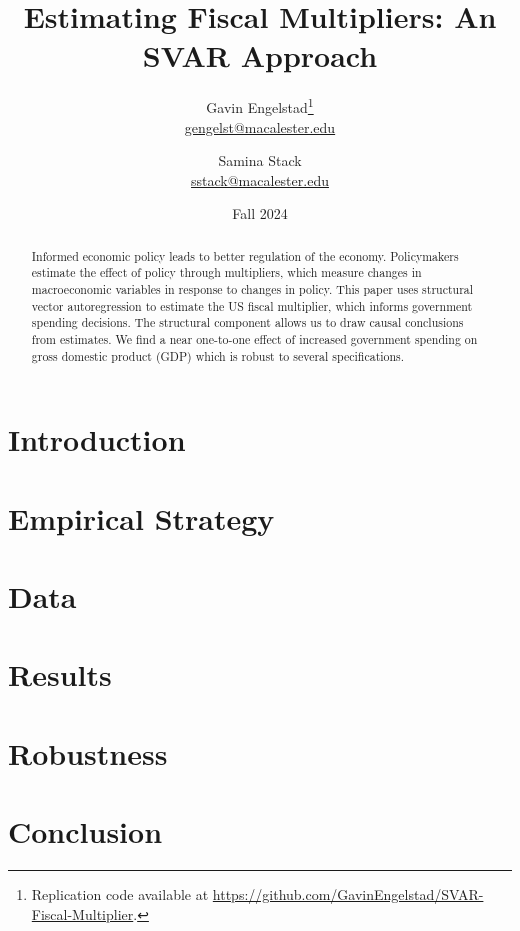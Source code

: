 \documentclass[11pt]{article}
\title{Estimating Fiscal Multipliers: An SVAR Approach}
\author{Gavin Engelstad\thanks{Replication code available at \url{https://github.com/GavinEngelstad/SVAR-Fiscal-Multiplier}.} \\ \href{mailto:gengelst@macalester.edu}{gengelst@macalester.edu} \and Samina Stack \\ \href{mailto:sstack@macalester.edu}{sstack@macalester.edu}}
\date{Fall 2024}
\numberwithin{equation}{section} %
\numberwithin{figure}{section} %
\numberwithin{table}{section} %
\begin{document}
\maketitle

\begin{abstract}
Informed economic policy leads to better regulation of the economy.  Policymakers estimate the effect of policy through multipliers, which measure changes in macroeconomic variables in response to changes in policy.  This paper uses structural vector autoregression to estimate the US fiscal multiplier, which informs government spending decisions.  The structural component allows us to draw causal conclusions from estimates.  We find a near one-to-one effect of increased government spending on gross domestic product (GDP) which is robust to several specifications.
\end{abstract}

\section{Introduction} \label{sec:intro}


\section{Empirical Strategy} \label{sec:emp}


\section{Data} \label{sec:data}


\section{Results} \label{sec:results}


\section{Robustness} \label{sec:robust}


\section{Conclusion} \label{sec:concl}



\newpage
\printbibliography
\FloatBarrier
\end{document}
